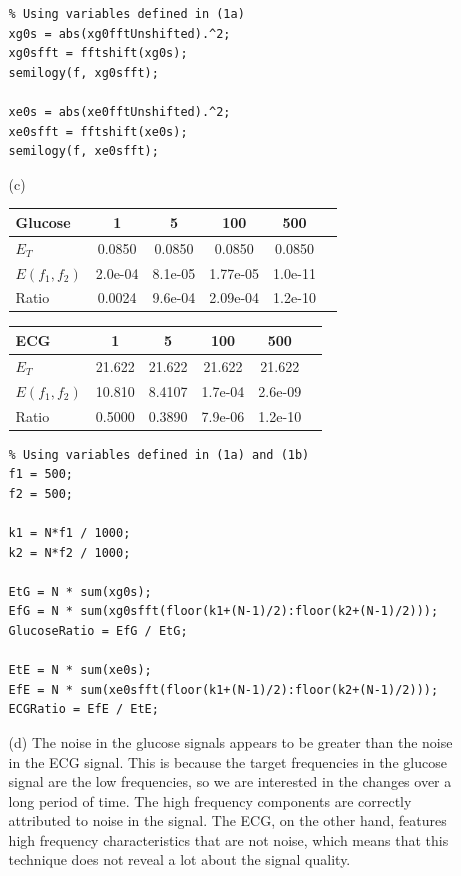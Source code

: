 \documentclass{article}
\begin{document}
\begin{enumerate}
\begin{enumerate}
\bigskip

\begin{lstlisting}
% Using variables defined in (1a)
xg0s = abs(xg0fftUnshifted).^2;
xg0sfft = fftshift(xg0s);
semilogy(f, xg0sfft);

xe0s = abs(xe0fftUnshifted).^2;
xe0sfft = fftshift(xe0s);
semilogy(f, xe0sfft);
\end{lstlisting}

\bigskip

	\item[(c)] $\:$ \\
\begin{tabular}{l*{4}{c}r}
Glucose        &   1    &   5      &  100     &  500       \\
\hline
$E_T$          & 0.0850   & 0.0850   &  0.0850  &  0.0850  \\
$E(f_1,f_2)$   & 2.0e-04  & 8.1e-05  & 1.77e-05 & 1.0e-11  \\
Ratio          & 0.0024   & 9.6e-04  & 2.09e-04 & 1.2e-10  \\
\end{tabular}

\bigskip

\begin{tabular}{l*{4}{c}r}
ECG            &   1    &   5      &  100     &  500       \\
\hline
$E_T$          & 21.622   & 21.622   &  21.622  &  21.622  \\
$E(f_1,f_2)$   & 10.810   & 8.4107   & 1.7e-04  & 2.6e-09  \\
Ratio          & 0.5000   & 0.3890   & 7.9e-06  & 1.2e-10  \\
\end{tabular}

\bigskip

\begin{lstlisting}
% Using variables defined in (1a) and (1b)
f1 = 500;
f2 = 500;

k1 = N*f1 / 1000;
k2 = N*f2 / 1000;

EtG = N * sum(xg0s);
EfG = N * sum(xg0sfft(floor(k1+(N-1)/2):floor(k2+(N-1)/2)));
GlucoseRatio = EfG / EtG;

EtE = N * sum(xe0s);
EfE = N * sum(xe0sfft(floor(k1+(N-1)/2):floor(k2+(N-1)/2)));
ECGRatio = EfE / EtE;
\end{lstlisting}

\bigskip

	\item[(d)]
	The noise in the glucose signals appears to be greater than the noise in the ECG signal. This is because the target frequencies in the glucose signal are the low frequencies, so we are interested in the changes over a long period of time. The high frequency components are correctly attributed to noise in the signal. The ECG, on the other hand, features high frequency characteristics that are not noise, which means that this technique does not reveal a lot about the signal quality.


\end{enumerate}
\end{enumerate}
\end{document}
